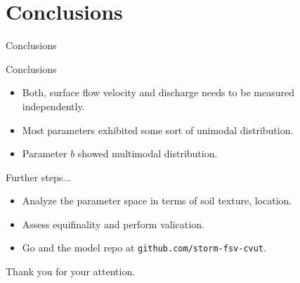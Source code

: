 \section{Conclusions}
\begin{frame}{Conclusions}
    \begin{block}{Conclusions}
        \begin{itemize}
          \item Both, surface flow velocity and discharge needs to be measured independently.
          \item Most parameters exhibited some sort of unimodal distribution.
          \item Parameter $b$ showed multimodal distribution. 
        \end{itemize}
    \end{block}
    \begin{block}{Further steps...}
        \begin{itemize}
          \item Analyze the parameter space in terms of soil texture, location. 
          \item Assess equifinality and perform valication.
          \item Go and the model repo at \texttt{github.com/storm-fsv-cvut}.
        \end{itemize}
    \end{block}
    \bigskip
    {\Large Thank you for your attention.}
\end{frame}
